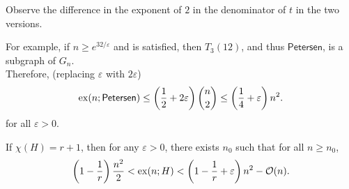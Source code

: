 \documentclass{article}
\begin{document}
			Observe the difference in the exponent of $2$ in the denominator of $t$ in the two versions.

			For example, if $n \ge e^{32/\varepsilon}$ and  is satisfied, then $T_{3}(12)$, and thus $\mathsf{Petersen}$, is a subgraph of $G_n$.\\
			Therefore, (replacing $\varepsilon$ with $2\varepsilon$)
			\[ \operatorname{ex}(n;\mathsf{Petersen}) \le \left(\frac{1}{2} + 2\varepsilon\right)\binom{n}{2} \le \left(\frac{1}{4} + \varepsilon\right)n^2. \]
			for all $\varepsilon > 0$.

			\begin{fcor}
				\label{theo: ESS exx square tight coloring}
				If $\chi(H) = r+1$, then for any $\varepsilon > 0$, there exists $n_0$ such that for all $n\ge n_0$,
				\[ \left(1 - \frac{1}{r}\right)\frac{n^2}{2} < \operatorname{ex}(n;H) < \left(1 - \frac{1}{r} + \varepsilon\right)n^2 - \mathcal{O}(n). \]
			\end{fcor}

\end{document}
